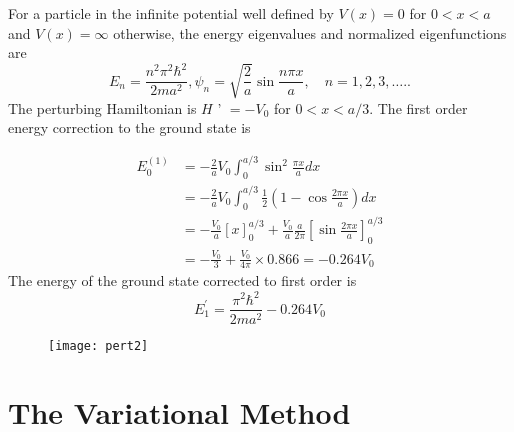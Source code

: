 \begin{answer}
For a particle in the infinite potential well defined by $V(x)=0$ for $0<x<a$ and $V(x)=\infty$ otherwise, the energy eigenvalues and normalized eigenfunctions are
$$
E_{n}=\frac{n^{2} \pi^{2} \hbar^{2}}{2 m a^{2}}, \psi_{n}=\sqrt{\frac{2}{a}} \sin \frac{n \pi x}{a}, \quad n=1,2,3, \ldots . .
$$
The perturbing Hamiltonian is $H$ ' $=-V_{0}$ for $0<x<a / 3$.
The first order energy correction to the ground state is\\
\begin{minipage}{0.5\textwidth}
$$
\begin{aligned}
E_{0}^{(1)} &=-\frac{2}{a} V_{0} \int_{0}^{a / 3} \sin ^{2} \frac{\pi x}{a} d x \\
&=-\frac{2}{a} V_{0} \int_{0}^{a / 3} \frac{1}{2}\left(1-\cos \frac{2 \pi x}{a}\right) d x \\
&=-\frac{V_{0}}{a}[x]_{0}^{a / 3}+\frac{V_{0}}{a} \frac{a}{2 \pi}\left[\sin \frac{2 \pi x}{a}\right]_{0}^{a / 3} \\
&=-\frac{V_{0}}{3}+\frac{V_{0}}{4 \pi} \times 0.866=-0.264 V_{0}
\end{aligned}
$$
The energy of the ground state corrected to first order is
$$
E_{1}^{\prime}=\frac{\pi^{2} \hbar^{2}}{2 m a^{2}}-0.264 V_{0}
$$	
\end{minipage}
\begin{minipage}{0.5\textwidth}
\begin{figure}[H]
	\centering
	\texttt{[image: pert2]}
	\caption{}
	\label{}
\end{figure}
\end{minipage}
\end{answer}
\section{The Variational Method}

